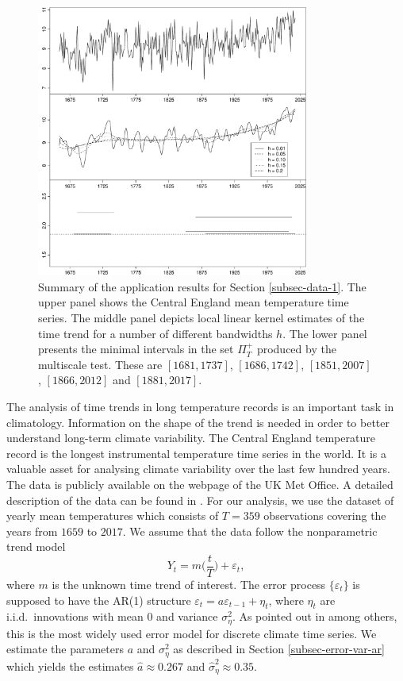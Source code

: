\begin{figure}[t]
\centering
\includegraphics[width=0.8\textwidth]{Plots/threegraphics_testing_constant_method_ll.pdf}
\caption{Summary of the application results for Section \ref{subsec-data-1}. The upper panel shows the Central England mean temperature time series. The middle panel depicts local linear kernel estimates of the time trend for a number of different bandwidths $h$. The lower panel presents the minimal intervals in the set $\Pi_T^+$ produced by the multiscale test. These are $[1681,1737]$, $[1686,1742]$, $[1851,2007]$, $[1866,2012]$ and $[1881,2017]$.}\label{plot-results-app1}
\end{figure}


\enlargethispage{0.2cm}
The analysis of time trends in long temperature records is an important task in climatology. Information on the shape of the trend is needed in order to better understand long-term climate variability. The Central England temperature record is the longest instrumental temperature time series in the world. It is a valuable asset for analysing climate variability over the last few hundred years. The data is publicly available on the webpage of the UK Met Office. A detailed description of the data can be found in \cite{Parker1992}. For our analysis, we use the dataset of yearly mean temperatures which consists of $T=359$ observations covering the years from $1659$ to $2017$. We assume that the data follow the nonparametric trend model 
\[ Y_t = m\Big(\frac{t}{T}\Big) + \varepsilon_t, \]
where $m$ is the unknown time trend of interest. The error process $\{ \varepsilon_t \}$ is supposed to have the AR(1) structure $\varepsilon_t = a \varepsilon_{t-1} + \eta_t$, where $\eta_t$ are i.i.d.\ innovations with mean $0$ and variance $\sigma_\eta^2$. As pointed out in \cite{Mudelsee2010} among others, this is the most widely used error model for discrete climate time series. We estimate the parameters $a$ and $\sigma_\eta^2$ as described in Section \ref{subsec-error-var-ar} which yields the estimates $\widehat{a} \approx 0.267$ and $\widehat{\sigma}_\eta^2 \approx 0.35$.


